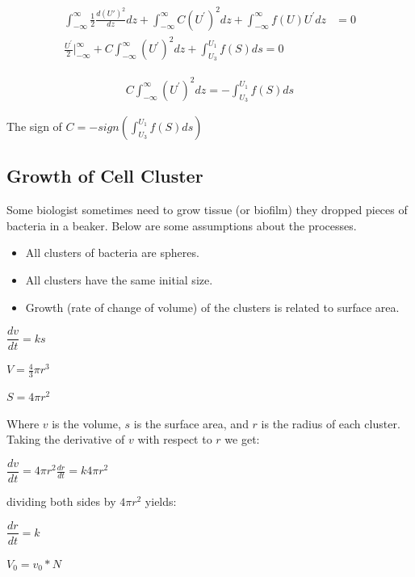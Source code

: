 \documentclass[]{article}
\numberwithin{equation}{section}		%
\begin{document}
\begin{align}
\int_{-\infty}^{\infty}\frac{1}{2}\frac{d({U}')^2}{dz}dz+\int_{-\infty}^{\infty}C(U^{'})^{2}dz+\int_{-\infty}^{\infty}f(U)U^{'}dz & =0\\
\frac{U^{'}}{2}|_{-\infty}^{\infty}\nonumber+C\int_{-\infty}^{\infty}(U^{'})^{2}dz\nonumber+\int_{U_{3}}^{U_{1}}f(S)ds=0
\end{align}

\begin{align}
C\int_{-\infty}^{\infty}(U^{'})^{2}dz\nonumber=-\int_{U_{3}}^{U_{1}}f(S)ds
\end{align}

The sign of $C = -sign (\int _{U_3}^{U_1}f (S )ds )$

\subsection{Growth of Cell Cluster}
Some biologist sometimes need to grow tissue (or biofilm) they dropped pieces of bacteria in a beaker. Below are some assumptions about the processes.

\begin{itemize}
	\item All clusters of bacteria are spheres.
	\item All clusters have the same initial size.
	\item Growth (rate of change of volume) of the clusters is related to surface area.
\end{itemize}
\begin{center}
$\dfrac{dv}{dt}=ks$
\end{center}
\begin{center}
$V=\frac{4}{3}\pi r^{3}$
\end{center}
\begin{center}
$S=4\pi r^{2}$
\end{center}

Where $v$ is the volume, $s$ is the surface area, and $r$ is the radius of each cluster. Taking the derivative of $v$ with respect to $r$ we get:
\begin{center}
$\dfrac{dv}{dt}=4\pi r^{2}\frac{dr}{dt}=k4\pi r^{2}$ 
\end{center}
dividing both sides by $4\pi r^{2}$ yields:
\begin{center}
$\dfrac{dr}{dt}= k$
\end{center}
\begin{center}
$V_{0}= v_{0}*N $
\end{center}
\end{document}
